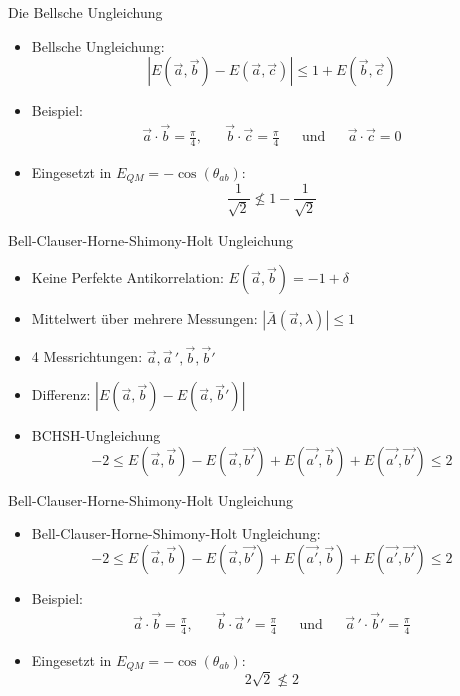 \documentclass{beamer}
\begin{document}
\begin{frame}{Die Bellsche Ungleichung}
    \begin{itemize}
        \item Bellsche Ungleichung:
            \[
                \left| E(\vec{a},\vec{b}) - E(\vec{a},\vec{c}) \right| 
                \leq
                1 + E(\vec{b},\vec{c})
            \]
        \item Beispiel:
            \begin{align*}
                \vec{a}\cdot\vec{b} = \frac{\pi}{4}, &&
                \vec{b}\cdot\vec{c} = \frac{\pi}{4} &&
                \text{und} &&
                \vec{a}\cdot\vec{c} = 0
            \end{align*}
        \item Eingesetzt in $E_{QM} = -\cos(\theta_{ab})$:
            \[
                \frac{1}{\sqrt{2}} \nleq 1 - \frac{1}{\sqrt{2}}
            \]
    \end{itemize}
\end{frame}
\begin{frame}{Bell-Clauser-Horne-Shimony-Holt Ungleichung}
    \begin{itemize}[<+->]
        \item Keine Perfekte Antikorrelation: 
                $E(\vec{a},\vec{b}) = -1+\delta$
        \item Mittelwert \"uber mehrere Messungen: 
                $\left|\bar{A}(\vec{a},\lambda)\right| \leq 1$
        \item 4 Messrichtungen:
                $\vec{a},\vec{a}\,',\vec{b},\vec{b}'$
        \item Differenz:
                $\left| E(\vec{a},\vec{b}) - E(\vec{a},\vec{b}') \right|$
        \item BCHSH-Ungleichung
                \[
                    -2 \leq 
                    E(\vec{a},\vec{b}) - E(\vec{a},\vec{b'}) + E(\vec{a'},\vec{b}) + E(\vec{a'},\vec{b'})
                    \leq 2
                \]
    \end{itemize}
\end{frame}
\begin{frame}{Bell-Clauser-Horne-Shimony-Holt Ungleichung}
    \begin{itemize}
        \item Bell-Clauser-Horne-Shimony-Holt Ungleichung:
            \[
                -2 \leq 
                E(\vec{a},\vec{b}) - E(\vec{a},\vec{b'}) + E(\vec{a'},\vec{b}) + E(\vec{a'},\vec{b'})
                \leq 2
            \]
        \item Beispiel:
            \begin{align*}
                \vec{a}\cdot\vec{b} = \frac{\pi}{4}, &&
                \vec{b}\cdot\vec{a}\,' = \frac{\pi}{4} &&
                \text{und} &&
                \vec{a}\,'\cdot\vec{b}' = \frac{\pi}{4}
            \end{align*}
        \item Eingesetzt in $E_{QM} = -\cos(\theta_{ab})$:
            \[
                2\sqrt{2} \nleq 2
            \]
    \end{itemize}
\end{frame}
\end{document}
